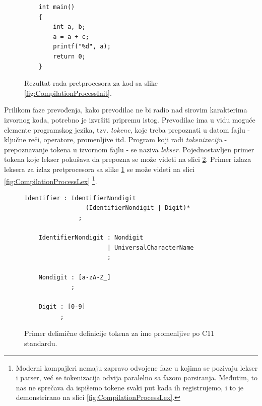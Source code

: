 \begin{figure}[h!]
    \begin{lstlisting}
    int main()
    {
        int a, b;
        a = a + c;
        printf("%d", a);
        return 0;
    }
    \end{lstlisting}
    \caption{Rezultat rada pretprocesora za kod sa slike 
             \ref{fig:CompilationProcessInit}.}
    \label{fig:CompilationProcessPrep}
\end{figure}

Prilikom faze prevođenja, kako prevodilac ne bi radio nad sirovim 
karakterima izvornog koda, potrebno je izvršiti pripremu istog. 
Prevodilac ima u vidu moguće elemente programskog jezika, tzv. 
\emph{tokene}, koje treba prepoznati u datom fajlu - ključne reči, 
operatore, promenljive itd. Program koji radi \emph{tokenizaciju} -
prepoznavanje tokena u izvornom fajlu - se naziva \emph{lekser}. 
Pojednostavljen primer tokena koje lekser pokušava da prepozna 
se može videti na slici \ref{fig:CLexerExample}. Primer izlaza
leksera za izlaz pretprocesora sa slike \ref{fig:CompilationProcessPrep}
se može videti na slici \ref{fig:CompilationProcessLex} \footnote{Moderni
kompajleri nemaju zapravo odvojene faze u kojima se pozivaju lekser i
parser, već se tokenizacija odvija paralelno sa fazom parsiranja. Međutim, 
to nas ne sprečava da ispišemo tokene svaki put kada ih registrujemo, i 
to je demonstrirano na slici \ref{fig:CompilationProcessLex}.}.

\begin{figure}[h!]
    \begin{lstlisting}[language={}]
    Identifier : IdentifierNondigit 
                 (IdentifierNondigit | Digit)*
               ;

    IdentifierNondigit : Nondigit
                       | UniversalCharacterName
                       ;

    Nondigit : [a-zA-Z_]
             ;

    Digit : [0-9]
          ;
    \end{lstlisting}
    \caption{Primer delimične definicije tokena za ime promenljive po C11 standardu.}
    \label{fig:CLexerExample}
\end{figure}

